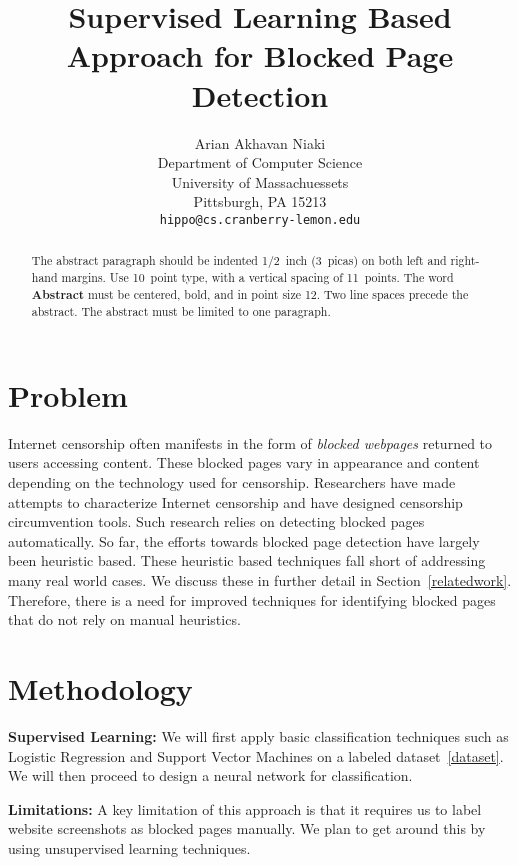 \documentclass{article} %
\title{Supervised Learning Based Approach for Blocked Page Detection}
\author{
Arian Akhavan Niaki\\
Department of Computer Science\\
University of Massachuessets\\
Pittsburgh, PA 15213 \\
\texttt{hippo@cs.cranberry-lemon.edu} \\
}
\begin{document}
\maketitle

\begin{abstract}
The abstract paragraph should be indented 1/2~inch (3~picas) on both left and
right-hand margins. Use 10~point type, with a vertical spacing of 11~points.
The word \textbf{Abstract} must be centered, bold, and in point size 12. Two
line spaces precede the abstract. The abstract must be limited to one
paragraph.
\end{abstract}
\section{Problem}
\vspace{-.2cm}
Internet censorship often manifests in the form of \emph{blocked webpages} returned to users accessing
content. These blocked pages vary in appearance and content depending on the technology used
for censorship. Researchers have made attempts to
characterize Internet censorship and have designed censorship circumvention tools. Such research relies on detecting blocked pages automatically.
So far, the efforts
towards blocked page detection have largely been heuristic based. These heuristic based techniques fall short of addressing many real world cases.
We discuss these in further detail in Section~\ref{relatedwork}. Therefore, there is a need for improved techniques for identifying blocked
pages that do not rely on manual heuristics.
\vspace{-.2cm}
\section{Methodology}
\vspace{-.2cm}

\textbf{Supervised Learning:}
We will first apply basic classification techniques such as Logistic Regression and Support Vector Machines on a labeled dataset~\ref{dataset}.
We will then proceed to design a neural network for classification.

\textbf{Limitations:} A key limitation of this approach is that it requires us to label website screenshots as blocked pages manually. We plan to get around this by using unsupervised
learning techniques.
\end{document}

